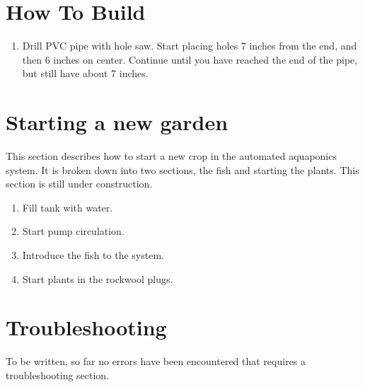 \documentclass[american,12pt]{article}
\begin{document}
\section{How To Build}
\begin{enumerate}
    \item Drill PVC pipe with hole saw. Start placing holes 7 inches from the
        end, and then 6 inches on center. Continue until you have reached
        the end of the pipe, but still have about 7 inches.
\end{enumerate}


\section{Starting a new garden}
This section describes how to start a new crop in the automated aquaponics
system. It is broken down into two sections, the fish and starting the plants.
This section is still under construction.

\begin{enumerate}
    \item Fill tank with water.
    \item Start pump circulation.
    \item Introduce the fish to the system.
    \item Start plants in the rockwool plugs.
\end{enumerate}

\section{Troubleshooting}
To be written, so far no errors have been encountered that requires a
troubleshooting section.


\printbibliography
\end{document}
